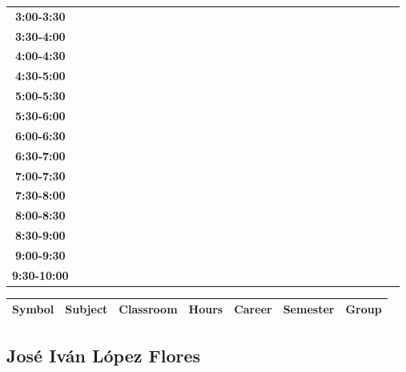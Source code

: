 \documentclass{article}
\begin{document}
\begin{table}[ht]
\begin{tabular}{|c|c|c|c|c|c|c|c|c|c|c|c|c|c|c|c|c|c|c|c|c|c|c|c|c|c|c|c|c|c|}
\textbf{3:00-3:30} &   &   &   &   &   &   &   \\
 \cline{1-8} 
\textbf{3:30-4:00} &   &   &   &   &   &   &   \\
 \cline{1-8} 
\textbf{4:00-4:30} &   &   &   &   &   &   &   \\
 \cline{1-8} 
\textbf{4:30-5:00} &   &   &   &   &   &   &   \\
 \cline{1-8} 
\textbf{5:00-5:30} &   &   &   &   &   &   &   \\
 \cline{1-8} 
\textbf{5:30-6:00} &   &   &   &   &   &   &   \\
 \cline{1-8} 
\textbf{6:00-6:30} &   &   &   &   &   &   &   \\
 \cline{1-8} 
\textbf{6:30-7:00} &   &   &   &   &   &   &   \\
 \cline{1-8} 
\textbf{7:00-7:30} &   &   &   &   &   &   &   \\
 \cline{1-8} 
\textbf{7:30-8:00} &   &   &   &   &   &   &   \\
 \cline{1-8} 
\textbf{8:00-8:30} &   &   &   &   &   &   &   \\
 \cline{1-8} 
\textbf{8:30-9:00} &   &   &   &   &   &   &   \\
 \cline{1-8} 
\textbf{9:00-9:30} &   &   &   &   &   &   &   \\
 \cline{1-8} 
\textbf{9:30-10:00} &   &   &   &   &   &   &   \\
 \cline{1-8} 
\end{tabular}\end{table}

        
        \begin{tabular}{|>{\centering\arraybackslash}m{2cm}|>{\centering\arraybackslash}m{4cm}|>{\centering\arraybackslash}m{2cm}|>{\centering\arraybackslash}m{2cm}|>{\centering\arraybackslash}m{2cm}|>{\centering\arraybackslash}m{2cm}|>{\centering\arraybackslash}m{2cm}|}
        \hline
        \textbf{Symbol} & \textbf{Subject} & \textbf{Classroom} & \textbf{Hours} & \textbf{Career} & \textbf{Semester} & \textbf{Group} \\
        \hline
        \end{tabular}
                    

        \newpage
        

        \subsection{Jos\'e Iv\'an L\'opez Flores}
        \vspace*{.1cm}
        
\end{document}
